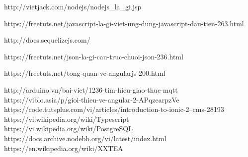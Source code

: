 \documentclass[a4paper,12pt,oneside]{article}
\begin{document}
\begin{thebibliography}{80}
 http://vietjack.com/nodejs/nodejs\_la\_gi.jsp

 https://freetuts.net/javascript-la-gi-viet-ung-dung-javascript-dau-tien-263.html

 http://docs.sequelizejs.com/

 https://freetuts.net/json-la-gi-cau-truc-chuoi-json-236.html

 https://freetuts.net/tong-quan-ve-angularjs-200.html

 http://arduino.vn/bai-viet/1236-tim-hieu-giao-thuc-mqtt
 https://viblo.asia/p/gioi-thieu-ve-angular-2-APqzearpzVe 
 https://code.tutsplus.com/vi/articles/introduction-to-ionic-2--cms-28193 
 https://vi.wikipedia.org/wiki/Typescript 
 https://vi.wikipedia.org/wiki/PostgreSQL 
 https://docs.archive.nodebb.org/vi/latest/index.html 
 https://en.wikipedia.org/wiki/XXTEA
\end{thebibliography}
\end{document}
